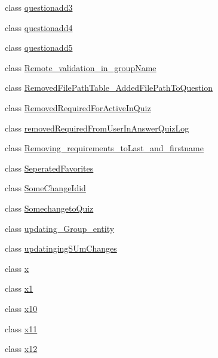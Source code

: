 \begin{DoxyCompactItemize}
class \hyperlink{class_website_1_1_migrations_1_1questionadd3}{questionadd3}
\item 
class \hyperlink{class_website_1_1_migrations_1_1questionadd4}{questionadd4}
\item 
class \hyperlink{class_website_1_1_migrations_1_1questionadd5}{questionadd5}
\item 
class \hyperlink{class_website_1_1_migrations_1_1_remote__validation__in__group_name}{Remote\+\_\+validation\+\_\+in\+\_\+group\+Name}
\item 
class \hyperlink{class_website_1_1_migrations_1_1_removed_file_path_table___added_file_path_to_question}{Removed\+File\+Path\+Table\+\_\+\+Added\+File\+Path\+To\+Question}
\item 
class \hyperlink{class_website_1_1_migrations_1_1_removed_required_for_active_in_quiz}{Removed\+Required\+For\+Active\+In\+Quiz}
\item 
class \hyperlink{class_website_1_1_migrations_1_1removed_required_from_user_in_answer_quiz_log}{removed\+Required\+From\+User\+In\+Answer\+Quiz\+Log}
\item 
class \hyperlink{class_website_1_1_migrations_1_1_removing__requirements__to_last__and__firstname}{Removing\+\_\+requirements\+\_\+to\+Last\+\_\+and\+\_\+firstname}
\item 
class \hyperlink{class_website_1_1_migrations_1_1_seperated_favorites}{Seperated\+Favorites}
\item 
class \hyperlink{class_website_1_1_migrations_1_1_some_change_idid}{Some\+Change\+Idid}
\item 
class \hyperlink{class_website_1_1_migrations_1_1_somechangeto_quiz}{Somechangeto\+Quiz}
\item 
class \hyperlink{class_website_1_1_migrations_1_1updating___group__entity}{updating\+\_\+\+Group\+\_\+entity}
\item 
class \hyperlink{class_website_1_1_migrations_1_1updatinging_s_um_changes}{updatinging\+S\+Um\+Changes}
\item 
class \hyperlink{class_website_1_1_migrations_1_1x}{x}
\item 
class \hyperlink{class_website_1_1_migrations_1_1x1}{x1}
\item 
class \hyperlink{class_website_1_1_migrations_1_1x10}{x10}
\item 
class \hyperlink{class_website_1_1_migrations_1_1x11}{x11}
\item 
class \hyperlink{class_website_1_1_migrations_1_1x12}{x12}
\item 

\end{DoxyCompactItemize}
